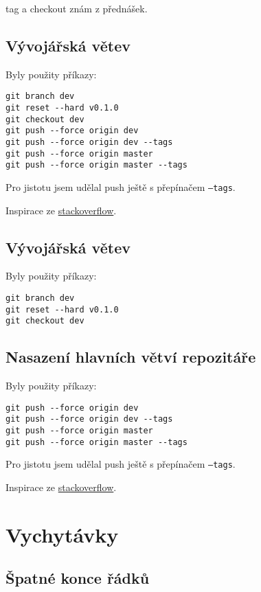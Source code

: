 \documentclass[titlepage]{article}
\begin{document}
tag a checkout znám z přednášek.

\subsection{Vývojářská větev}

Byly použity příkazy:

\begin{verbatim}
git branch dev
git reset --hard v0.1.0
git checkout dev
git push --force origin dev
git push --force origin dev --tags
git push --force origin master
git push --force origin master --tags
\end{verbatim}

Pro jistotu jsem udělal push ještě s přepínačem \texttt{--tags}.

Inspirace ze \href{https://stackoverflow.com/questions/1628563/move-the-most-recent-commits-to-a-new-branch-with-git}{stackoverflow}.

\subsection{Vývojářská větev}
Byly použity příkazy:

\begin{verbatim}
git branch dev
git reset --hard v0.1.0
git checkout dev
\end{verbatim}

\subsection{Nasazení hlavních větví repozitáře}
Byly použity příkazy:
\begin{verbatim}
git push --force origin dev
git push --force origin dev --tags
git push --force origin master
git push --force origin master --tags
\end{verbatim}

Pro jistotu jsem udělal push ještě s přepínačem \texttt{--tags}.

Inspirace ze \href{https://stackoverflow.com/questions/1628563/move-the-most-recent-commits-to-a-new-branch-with-git}{stackoverflow}.

\section{Vychytávky}

\subsection{Špatné konce řádků}
\end{document}
